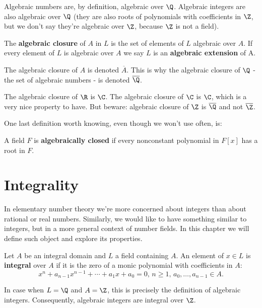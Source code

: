 \begin{ex}
Algebraic numbers are, by definition, algebraic over $\Q$. Algebraic integers are also algebraic over $\Q$ (they are also roots of polynomials with coefficients in $\Z$, but we don't say they're algebraic over $\Z$, because $\Z$ is not a field).
\end{ex}

\begin{df}
The \textbf{algebraic closure} of $A$ in $L$ is the set of elements of $L$ algebraic over $A$. If every element of $L$ is algebraic over $A$ we say $L$ is an \textbf{algebraic extension} of A.
\end{df}

\noindent The algebraic closure of $A$ is denoted $\overline{A}$. This is why the algebraic closure of $\Q$ - the set of algebraic numbers - is denoted $\overline\Q$.

\begin{rem}
The algebraic closure of $\R$ is $\C$. The algebraic closure of $\C$ is $\C$, which is a very nice property to have. But beware: algebraic closure of $\Z$ is $\overline\Q$ and not $\overline\Z$.
\end{rem}

\noindent One last definition worth knowing, even though we won't use often, is:

\begin{df}
A field $F$ is \textbf{algebraically closed} if every nonconstant polynomial in $F[x]$ has a root in $F$.
\end{df}

\section{Integrality}

In elementary number theory we're more concerned about integers than about rational or real numbers. Similarly, we would like to have
something similar to integers, but in a more general context of number fields. In this chapter we will define such object and explore its properties.
\begin{df}
Let $A$ be an integral domain and $L$ a field containing $A$. An element of $x\in L$ is \textbf{integral} over $A$ if it is the zero of a monic polynomial with coefficients in $A$:
\[
x^n+a_{n-1}x^{n-1}+\cdots +a_1x+a_0=0,\, n\ge 1,\, a_0,\ldots, a_{n-1}\in A.
\]
\end{df}
\begin{ex}
In case when $L = \Q$ and $A = \Z$, this is precisely the definition of algebraic integers. Consequently, algebraic integers are integral over $\Z$.
\end{ex}


